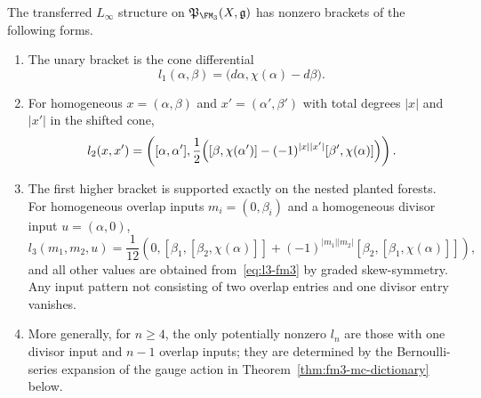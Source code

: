 \begin{theorem}
\label{thm:fm3-explicit-brackets}
The transferred $L_\infty$ structure on $\mathfrak P_{\FM_3}(X,\mathfrak g)$ has
nonzero brackets of the following forms.
\begin{enumerate}[label=\textup{(\alph*)}]
\item The unary bracket is the cone differential
  \[
  l_1(\alpha,\beta)=\bigl(d\alpha,\chi(\alpha)-d\beta\bigr).
  \]
\item For homogeneous $x=(\alpha,\beta)$ and $x'=(\alpha',\beta')$ with total
  degrees $|x|$ and $|x'|$ in the shifted cone,
  \begin{equation}
  \label{eq:l2-fm3}
  l_2(x,x')
  =
  \left(
  [\alpha,\alpha'],
  \frac12\Bigl([\beta,\chi(\alpha')] - (-1)^{|x||x'|}[\beta',\chi(\alpha)]\Bigr)
  \right).
  \end{equation}
\item The first higher bracket is supported exactly on the nested planted forests.
  For homogeneous overlap inputs $m_i=(0,\beta_i)$ and a homogeneous divisor
  input $u=(\alpha,0)$,
  \begin{equation}
  \label{eq:l3-fm3}
  l_3(m_1,m_2,u)
  =
  \frac1{12}
  \left(
  0,
  [\beta_1,[\beta_2,\chi(\alpha)]]
  + (-1)^{|m_1||m_2|}[\beta_2,[\beta_1,\chi(\alpha)]]
  \right),
  \end{equation}
  and all other values are obtained from~\eqref{eq:l3-fm3} by graded
  skew-symmetry.  Any input pattern not consisting of two overlap entries and one
  divisor entry vanishes.
\item More generally, for $n\geq 4$, the only potentially nonzero $l_n$ are those
  with one divisor input and $n-1$ overlap inputs; they are determined by the
  Bernoulli-series expansion of the gauge action in
  Theorem~\ref{thm:fm3-mc-dictionary} below.
\end{enumerate}
\end{theorem}

